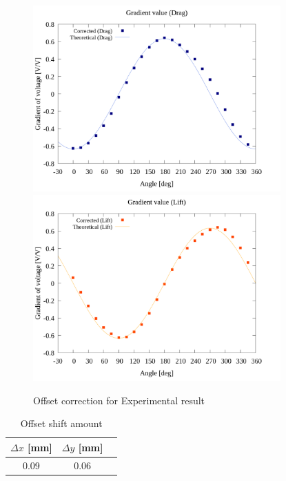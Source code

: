 \begin{figure}[htbp]
  \begin{center}
    \includegraphics[width=95mm]{../../02_workspace/result/2-ex/plot/21/21-2_corrected_offset_drag.png}
    \includegraphics[width=95mm]{../../02_workspace/result/2-ex/plot/21/21-2_corrected_offset_lift.png}
  \end{center}
  \caption{Offset correction for Experimental result}
\end{figure}

\begin{table}[htbp]
  \begin{center}
    \caption{Offset shift amount}
    \begin{tabular}{|p{30mm}|p{20mm}|p{20mm}|}
      \hline
      \multicolumn{1}{|c|}{$\Delta x$ [mm]} & \multicolumn{1}{|c|}{$\Delta y$ [mm]} \\ \hline
      \multicolumn{1}{|c|}{0.09}            & \multicolumn{1}{|c|}{0.06}            \\ \hline
    \end{tabular}
  \end{center}
\end{table}

